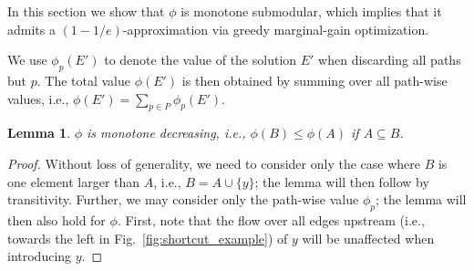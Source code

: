 \documentclass[11pt,letterpaper]{article}
\newtheorem{lemma}{Lemma}
\begin{document}
In this section we show that $\phi$ is monotone submodular, which implies that it admits a $(1-1/e)$-approximation via greedy marginal\hyp gain optimization.

We use $\phi_p(E')$ to denote the value of the solution $E'$ when discarding all paths but $p$. The total value $\phi(E')$ is then obtained by summing over all path-wise values, i.e., $\phi(E') = \sum_{p \in P} \phi_p(E')$.

\begin{lemma}
\label{thm:monotonicity}
$\phi$ is monotone decreasing, i.e., $\phi(B) \leq \phi(A)$ if $A \subseteq B$.
\end{lemma}

\begin{proof}[Proof]
Without loss of generality, we need to consider only the case where $B$ is one element larger than $A$, i.e., $B = A \cup \{y\}$; the lemma will then follow by transitivity. Further, we may consider only the path-wise value $\phi_p$; the lemma will then also hold for $\phi$.
First, note that the flow over all edges upstream (i.e., towards the left in Fig.~\ref{fig:shortcut_example}) of $y$ will be unaffected when introducing $y$.
\end{proof}
\end{document}
